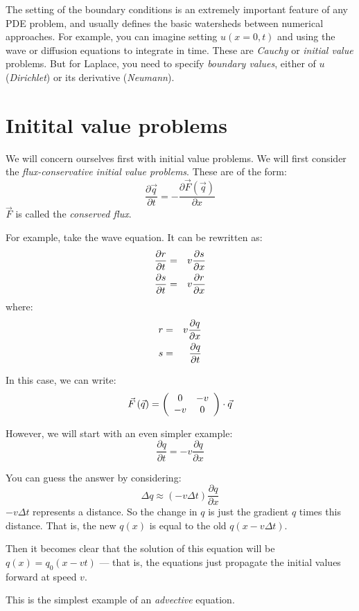 The setting of the boundary conditions is an extremely important
feature of any PDE problem, and usually defines the basic watersheds
between numerical approaches. For example, you can imagine setting
$u(x=0, t)$ and using the wave or diffusion equations to integrate in
time.  These are {\it Cauchy} or {\it initial value} problems.
But for Laplace, you need to specify {\it boundary values}, either of
$u$ ({\it Dirichlet}) or its derivative ({\it Neumann}).

\section{Initital value problems}

We will concern ourselves first with initial value problems. We will
first consider the {\it flux-conservative initial value
  problems}. These are of the form:
\begin{equation}
  \frac{\partial \vec{q}}{\partial t} =
  - \frac{\partial \vec{F}\left(\vec{q}\right)}{\partial x}
\end{equation}
$\vec{F}$ is called the {\it conserved flux}.

For example, take the wave equation. It can be rewritten as:
\begin{eqnarray}
\frac{\partial r}{\partial t} &=&  v \frac{\partial s}{\partial x} \cr
\frac{\partial s}{\partial t} &=&  v \frac{\partial r}{\partial x}
\end{eqnarray}
where:
\begin{eqnarray}
r &=& v \frac{\partial q}{\partial x}\cr
s &=& \frac{\partial q}{\partial t}
\end{eqnarray}

In this case, we can write:
\begin{equation}
\vec{F}\left(\vec{q}\right) = 
\left(\begin{array}{cc}
  0 & -v \cr
  -v & 0 
\end{array}\right) \cdot \vec{q}
\end{equation}

However, we will start with an even simpler example:
\begin{equation}
\frac{\partial q}{\partial t} = - v\frac{\partial q}{\partial x}
\end{equation}


\begin{answer}
  You can guess the answer by considering:
  \begin{equation}
    {\Delta q} \approx (-v \Delta t) \frac{\partial q}{\partial x}
  \end{equation}
  $-v\Delta t$ represents a distance. So the change in $q$ is just the
  gradient $q$ times this distance. That is, the new $q(x)$ is equal
  to the old $q(x-v\Delta t)$. 

  Then it becomes clear that the solution of this equation will be
  $q(x) = q_0(x-vt)$ --- that is, the equations just propagate the
  initial values forward at speed $v$.

  This is the simplest example of an {\it advective} equation. 
\end{answer}

